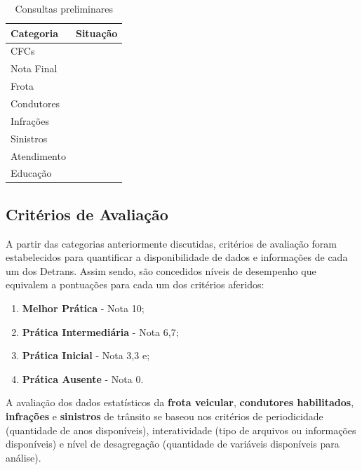 \documentclass[
  a4paper,
]{article}
\begin{document}
\begin{longtable}{lc}

\caption{\label{tbl-consultas}Consultas preliminares}

\tabularnewline

\toprule
Categoria & Situação \\ 
\midrule\addlinespace[2.5pt]
CFCs & \cellcolor[HTML]{1FA149}{\textcolor[HTML]{FFFFFF}{Presente}} \\ 
Nota Final & \cellcolor[HTML]{1FA149}{\textcolor[HTML]{FFFFFF}{Presente}} \\ 
Frota & \cellcolor[HTML]{D7191C}{\textcolor[HTML]{FFFFFF}{Ausente}} \\ 
Condutores & \cellcolor[HTML]{D7191C}{\textcolor[HTML]{FFFFFF}{Ausente}} \\ 
Infrações & \cellcolor[HTML]{D7191C}{\textcolor[HTML]{FFFFFF}{Ausente}} \\ 
Sinistros & \cellcolor[HTML]{D7191C}{\textcolor[HTML]{FFFFFF}{Ausente}} \\ 
Atendimento & \cellcolor[HTML]{1FA149}{\textcolor[HTML]{FFFFFF}{Presente}} \\ 
Educação & \cellcolor[HTML]{1FA149}{\textcolor[HTML]{FFFFFF}{Presente}} \\ 
\bottomrule

\end{longtable}

\subsection{Critérios de
Avaliação}\label{crituxe9rios-de-avaliauxe7uxe3o}

A partir das categorias anteriormente discutidas, critérios de avaliação
foram estabelecidos para quantificar a disponibilidade de dados e
informações de cada um dos Detrans. Assim sendo, são concedidos níveis
de desempenho que equivalem a pontuações para cada um dos critérios
aferidos:

\begin{enumerate}
\def\labelenumi{\arabic{enumi}.}
\item
  \textbf{Melhor Prática} - Nota 10;
\item
  \textbf{Prática Intermediária} - Nota 6,7;
\item
  \textbf{Prática Inicial} - Nota 3,3 e;
\item
  \textbf{Prática Ausente} - Nota 0.
\end{enumerate}

A avaliação dos dados estatísticos da \textbf{frota veicular},
\textbf{condutores habilitados}, \textbf{infrações} e \textbf{sinistros}
de trânsito se baseou nos critérios de periodicidade (quantidade de anos
disponíveis), interatividade (tipo de arquivos ou informações
disponíveis) e nível de desagregação (quantidade de variáveis
disponíveis para análise).
\end{document}
